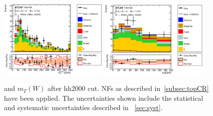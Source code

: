 \begin{figure}[!h]
\begin{center}
\includegraphics*[width=0.47\textwidth] {figures/ControlPlots/reOpt2000/C_mBBcr_reOpt2000_bbpt350_wwpt250_drww15_hh2000_MET_regionA_met25d020}
\includegraphics*[width=0.47\textwidth] {figures/ControlPlots/reOpt2000/C_mBBcr_reOpt2000_bbpt350_wwpt250_drww15_hh2000_wlepmtben_regionA_met25d020.eps}
\caption[\met and  $m_{T}(W)$ after hh2000 cut.]{\met and  $m_{T}(W)$ after hh2000 cut.  \ttbar NFs as described in~\ref{subsec:topCR} have been applied. The uncertainties shown include the statistical and systematic uncertainties described in ~\ref{sec:syst}.}
\end{center}
\end{figure}


